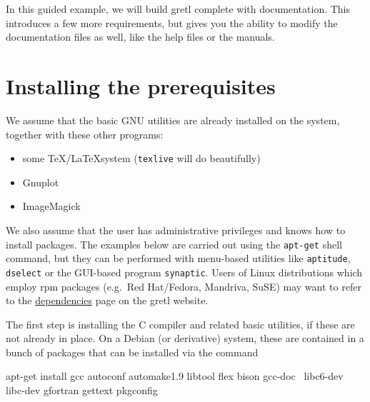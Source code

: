 In this guided example, we will build gretl complete with
documentation.  This introduces a few more requirements, but gives you
the ability to modify the documentation files as well, like the help
files or the manuals.

\section{Installing the prerequisites}

We assume that the basic GNU utilities are already installed on the
system, together with these other programs:
\begin{itemize}
\item some \TeX/\LaTeX system (\texttt{texlive} will do beautifully)
\item Gnuplot
\item ImageMagick
\end{itemize}
We also assume that the user has administrative privileges and knows
how to install packages.  The examples below are carried out using the
\texttt{apt-get} shell command, but they can be performed with
menu-based utilities like \texttt{aptitude}, \texttt{dselect} or the
GUI-based program \texttt{synaptic}. Users of Linux distributions
which employ rpm packages (e.g.\ Red Hat/Fedora, Mandriva, SuSE) may
want to refer to the
\href{http://gretl.sourceforge.net/depend.html}{dependencies} page on
the gretl website.

The first step is installing the C compiler and related basic
utilities, if these are not already in place. On a Debian (or
derivative) system, these are contained in a bunch of packages that
can be installed via the command
\begin{code}
apt-get install gcc autoconf automake1.9 libtool flex bison gcc-doc \
libc6-dev libc-dev gfortran gettext pkgconfig
\end{code}

